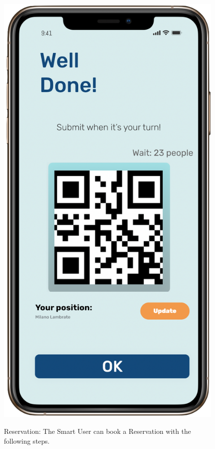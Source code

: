 \begin{figure}[H]
\begin{center}
{            \includegraphics[scale=0.30]{images/mockup/qrcode_reservation_done.png}
        }
%
    \end{center}
    \caption{Reservation: The Smart User can book a Reservation with the following steps.}
   \label{fig:subfigures}
\end{figure}

